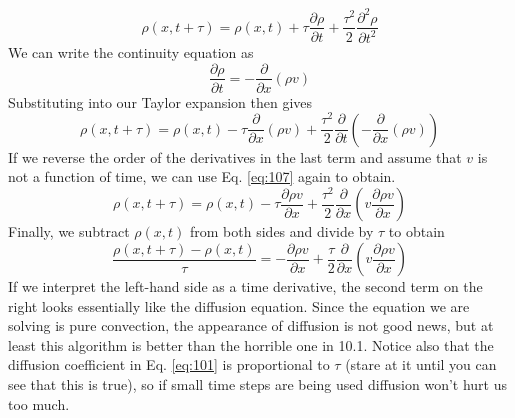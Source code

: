 \begin{equation}\label{eq:106}
\rho(x, t+\tau)=\rho(x, t)+\tau \frac{\partial \rho}{\partial t}+\frac{\tau^{2}}{2} \frac{\partial^{2} \rho}{\partial t^{2}}
\end{equation}
We can write the continuity equation as
\begin{equation}\label{eq:107}
\frac{\partial \rho}{\partial t}=-\frac{\partial}{\partial x}(\rho v)
\end{equation}
Substituting into our Taylor expansion then gives
\begin{equation}\label{eq:108}
\rho(x, t+\tau)=\rho(x, t)-\tau \frac{\partial}{\partial x}(\rho v)+\frac{\tau^{2}}{2} \frac{\partial}{\partial t}\left(-\frac{\partial}{\partial x}(\rho v)\right)
\end{equation}
If we reverse the order of the derivatives in the last term and assume that $v$ is not
a function of time, we can use Eq. \ref{eq:107} again to obtain.
\begin{equation}\label{eq:109}
\rho(x, t+\tau)=\rho(x, t)-\tau \frac{\partial \rho v}{\partial x}+\frac{\tau^{2}}{2} \frac{\partial}{\partial x}\left(v \frac{\partial \rho v}{\partial x}\right)
\end{equation}
Finally, we subtract $ρ(x,t)$ from both sides and divide by $\tau$ to obtain
\begin{equation}\label{eq:1010}
\frac{\rho(x, t+\tau)-\rho(x, t)}{\tau}=-\frac{\partial \rho v}{\partial x}+\frac{\tau}{2} \frac{\partial}{\partial x}\left(v \frac{\partial \rho v}{\partial x}\right)
\end{equation}
If we interpret the left-hand side as a time derivative, the second term on the right looks essentially like the diffusion equation. Since the equation we are solving is pure convection, the appearance of diffusion is not good news, but at least this algorithm is better than the horrible one in 10.1. Notice also that the diffusion coefficient in Eq. \ref{eq:101} is proportional to $\tau$ (stare at it until you can see that this is true), so if small time steps are being used diffusion won't hurt us too much.

